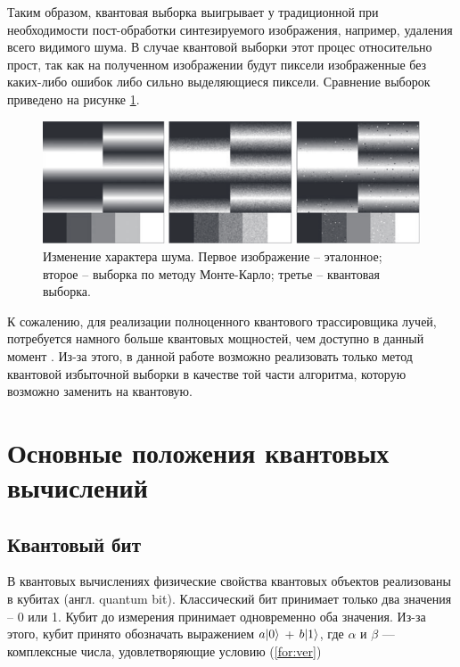 Таким образом, квантовая выборка выигрывает у традиционной при необходимости пост-обработки синтезируемого изображения, например, удаления всего видимого шума. В случае квантовой выборки этот процес относительно прост, так как на полученном изображении будут пиксели изображенные без каких-либо ошибок либо сильно выделяющиеся пиксели. Сравнение выборок приведено на рисунке \ref{img:compare}.
 
\begin{figure}[H]
 	\begin{center}
 		\includegraphics[scale=0.7]{img/compare.png}
 	\end{center}
 	\captionsetup{justification=centering}
 	\caption{Изменение характера шума. Первое изображение -- эталонное; второе -- выборка по методу Монте-Карло; третье -- квантовая выборка.}
 	\label{img:compare}
\end{figure}

К сожалению, для реализации полноценного квантового трассировщика лучей, потребуется намного больше квантовых мощностей, чем доступно в данный момент \cite{PQC-limits}. Из-за этого, в данной работе возможно реализовать только метод квантовой избыточной выборки в качестве той части алгоритма, которую возможно заменить на квантовую.

\section{Основные положения квантовых вычислений}

\subsection{Квантовый бит}

В квантовых вычислениях физические свойства квантовых объектов реализованы в кубитах (англ. quantum bit). Классический бит принимает только два значения – 0 или 1. Кубит до измерения принимает одновременно оба значения. Из-за этого, кубит принято обозначать выражением $a\lvert0\rangle$ + $b\lvert1\rangle$, где $\alpha$ и $\beta$ — комплексные числа, удовлетворяющие условию (\ref{for:ver})

